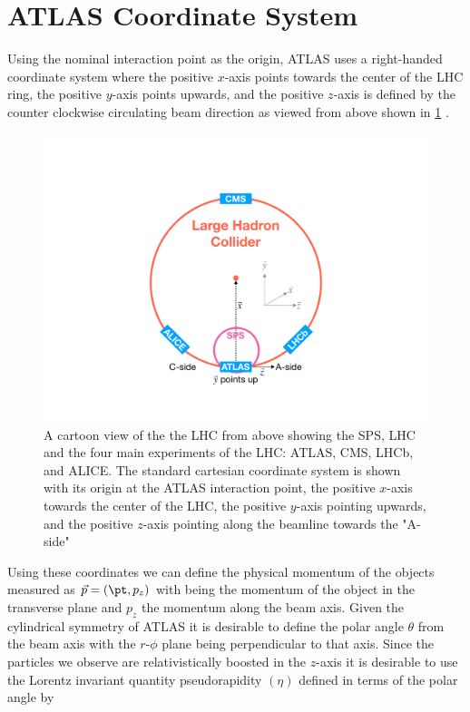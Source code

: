 \section{ATLAS Coordinate System} \label{sec:atlas:coordinates}

Using the nominal interaction point as the origin, ATLAS uses a right-handed
coordinate system where the positive $x$-axis points towards the center of the
LHC ring, the positive $y$-axis points upwards, and the positive $z$-axis is
defined by the counter clockwise circulating beam direction as viewed from
above shown in \cref{fig:atlas_geometry} \cite{PERF-2007-01}.  
 
\begin{figure}[!htbp]
  \begin{center}
    \includegraphics[width=0.5\linewidth]{figures/atlas/atlas_geometry}
    \caption{ \cite{Stark:2317296} A cartoon view of the the LHC from above
showing the SPS, LHC and the four main experiments of the LHC: ATLAS, CMS, LHCb,
and ALICE.  The standard cartesian coordinate system is shown with its origin at
the ATLAS interaction point, the positive $x$-axis towards the center of the
LHC, the positive $y$-axis pointing upwards, and the positive $z$-axis pointing
along the beamline towards the "A-side"}
    \label{fig:atlas_geometry}
  \end{center}
\end{figure}

Using these coordinates we can define the physical momentum of the objects
measured as $\vec{p} = (\pt,p_z)$ with \pt being the momentum of the object in
the transverse plane and $p_z$ the momentum along the beam axis. Given the
cylindrical symmetry of ATLAS it is desirable to define the polar angle
$\theta$ from the beam axis with the $r$-$\phi$ plane being perpendicular to that
axis. Since the particles we observe are relativistically boosted in the
$z$-axis it is desirable to use the Lorentz invariant quantity pseudorapidity
$(\eta)$ defined in terms of the polar angle by

